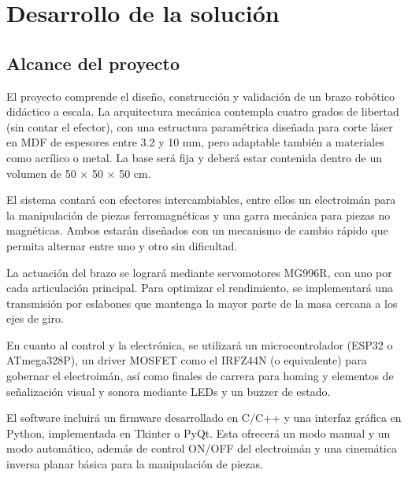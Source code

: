 \section{Desarrollo de la solución}

\subsection{Alcance del proyecto}
El proyecto comprende el diseño, construcción y validación de un brazo robótico didáctico a escala. La arquitectura mecánica contempla cuatro grados de libertad (sin contar el efector), con una estructura paramétrica diseñada para corte láser en MDF de espesores entre 3.2 y 10 mm, pero adaptable también a materiales como acrílico o metal. La base será fija y deberá estar contenida dentro de un volumen de 50 $\times$ 50 $\times$ 50 cm.

\vspace{1em}

El sistema contará con efectores intercambiables, entre ellos un electroimán para la manipulación de piezas ferromagnéticas y una garra mecánica para piezas no magnéticas. Ambos estarán diseñados con un mecanismo de cambio rápido que permita alternar entre uno y otro sin dificultad.

\vspace{1em}

La actuación del brazo se logrará mediante servomotores MG996R, con uno por cada articulación principal. Para optimizar el rendimiento, se implementará una transmisión por eslabones que mantenga la mayor parte de la masa cercana a los ejes de giro.

\vspace{1em}

En cuanto al control y la electrónica, se utilizará un microcontrolador (ESP32 o ATmega328P), un driver MOSFET como el IRFZ44N (o equivalente) para gobernar el electroimán, así como finales de carrera para homing y elementos de señalización visual y sonora mediante LEDs y un buzzer de estado.

\vspace{1em}

El software incluirá un firmware desarrollado en C/C++ y una interfaz gráfica en Python, implementada en Tkinter o PyQt. Esta ofrecerá un modo manual y un modo automático, además de control ON/OFF del electroimán y una cinemática inversa planar básica para la manipulación de piezas.

\vspace{1em}

